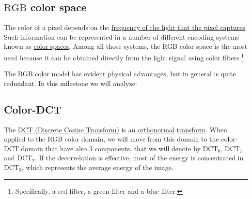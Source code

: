 
\subsection{$\text{RGB}$ color space}

The color of a pixel depends on the
\href{https://en.wikipedia.org/wiki/Visible_spectrum}{frequency of the
  light that the pixel captures}. Such information can be represented
in a number of different encoding systems known as
\href{https://en.wikipedia.org/wiki/Color_space}{color spaces}. Among
all those systems, the RGB color space is the most used because it can
be obtained directly from the light signal using color
filters.\footnote{Specifically, a red filter, a green filter and a
blue filter.}

The RGB color model has evident physical advantages, but in general is
quite redundant. In this milestone we will analyze:

\subsection{Color-DCT}

The \href{https://en.wikipedia.org/wiki/Discrete_cosine_transform}{DCT
  (Discrete Cosine Transform)} is an
\href{https://en.wikipedia.org/wiki/Orthonormality}{orthonormal}
\href{https://vicente-gonzalez-ruiz.github.io/transform_coding/}{transform}. When
applied to the RGB color domain, we will move from this domain to the
color-DCT domain that have also 3 components, that we will denote by
DCT$_0$, DCT$_1$ and DCT$_2$. If the decorrelation is effective, most
of the energy is concentrated in DCT$_0$, which represents the
average energy of the image.

